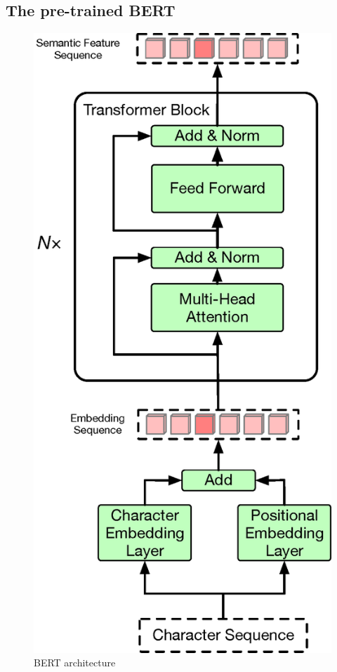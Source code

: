 \documentclass[a4paper]{article}
\begin{document}
\subsection{The pre-trained BERT}

\begin{figure}[t]
	\centering
	\includegraphics[scale=0.31]{pics3/bert2.eps}
	\caption{BERT architecture}
	\label{fig:bert}
\end{figure}
\end{document}
